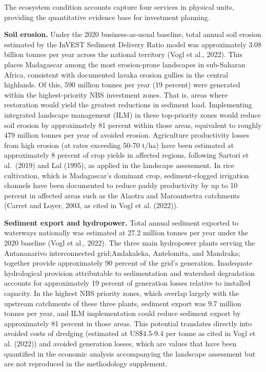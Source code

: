 \documentclass[
  letterpaper,
  DIV=11,
  numbers=noendperiod]{scrartcl}
\begin{document}
The ecosystem condition accounts capture four services in physical
units, providing the quantitative evidence base for investment planning.

\textbf{Soil erosion.} Under the 2020 business-as-usual baseline, total
annual soil erosion estimated by the InVEST Sediment Delivery Ratio
model was approximately 3.08 billion tonnes per year across the national
territory (Vogl et al., 2022). This places Madagascar among the most
erosion-prone landscapes in sub-Saharan Africa, consistent with
documented lavaka erosion gullies in the central highlands. Of this, 590
million tonnes per year (19 percent) were generated within the
highest-priority NBS investment zones. That is, areas where restoration
would yield the greatest reductions in sediment load. Implementing
integrated landscape management (ILM) in these top-priority zones would
reduce soil erosion by approximately 81 percent within those areas,
equivalent to roughly 479 million tonnes per year of avoided erosion.
Agriculture productivity losses from high erosion (at rates exceeding
50-70 t/ha) have been estimated at approximately 8 percent of crop
yields in affected regions, following Sartori et al.~(2019) and Lal
(1995), as applied in the landscape assessment. In rice cultivation,
which is Madagascar's dominant crop, sediment-clogged irrigation
channels have been documented to reduce paddy productivity by up to 10
percent in affected areas such as the Alaotra and Maroantsetra
catchments (Carret and Loyer, 2003, as cited in Vogl et al. (2022)).

\textbf{Sediment export and hydropower.} Total annual sediment exported
to waterways nationally was estimated at 27.2 million tonnes per year
under the 2020 baseline (Vogl et al., 2022). The three main hydropower
plants serving the Antananarivo interconnected grid;Andakaleka,
Antelomita, and Mandraka; together provide approximately 90 percent of
the grid's generation. Inadequate hydrological provision attributable to
sedimentation and watershed degradation accounts for approximately 19
percent of generation losses relative to installed capacity. In the
highest NBS priority zones, which overlap largely with the upstream
catchments of these three plants, sediment export was 9.7 million tonnes
per year, and ILM implementation could reduce sediment export by
approximately 81 percent in those areas. This potential translates
directly into avoided costs of dredging (estimated at US\$4.5-9.4 per
tonne as cited in Vogl et al. (2022)) and avoided generation losses,
which are values that have been quantified in the economic analysis
accompanying the landscape assessment but are not reproduced in the
methodology supplement.
\end{document}
